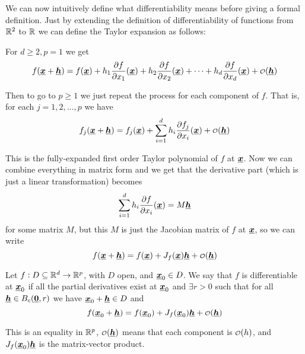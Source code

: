 \documentclass[12pt]{extarticle}
\renewcommand{\vec}[1]{\uvec{#1}}
\begin{document}
We can now intuitively define what differentiability means before giving a formal definition.
Just by extending the definition of differentiability of functions from $\mathbb{R}^2$ to $\mathbb{R}$ we can define the Taylor expansion as follows:

For $d \geq 2, p = 1$ we get
\begin{equation}
    f(\vec{x} + \vec{h}) = f(\vec{x}) + h_1 \pdv{f}{x_1}\/(\vec{x}) + h_2 \pdv{f}{x_2}\/(\vec{x}) + \cdots + h_d \pdv{f}{x_d}\/(\vec{x}) + \o(\vec{h})
\end{equation}

Then to go to $p \geq 1$ we just repeat the process for each component of $f$.
That is, for each $j = 1, 2, \ldots, p$ we have
\begin{equation}
    f_j(\vec{x} + \vec{h}) = f_j(\vec{x}) + \sum_{i=1}^d h_i \pdv{f_j}{x_i}\/(\vec{x}) + \o(\vec{h})
\end{equation}

This is the fully-expanded first order Taylor polynomial of $f$ at $\vec{x}$.
Now we can combine everything in matrix form and we get that the derivative part (which is just a linear transformation) becomes
\begin{equation}
    \sum_{i = 1}^d h_i \pdv{f}{x_i}\/(\vec{x}) = M \vec{h}
\end{equation}
for some matrix $M$, but this $M$ is just the Jacobian matrix of $f$ at $\vec{x}$, so we can write
\begin{equation}
    f(\vec{x} + \vec{h}) = f(\vec{x}) + J_f(\vec{x}) \vec{h} + \o(\vec{h})
\end{equation}

\begin{definition}[differentiability]
    Let $f: D \subseteq \mathbb{R}^d \to \mathbb{R}^p$, with $D$ open, and $\vec{x}_0 \in D$.
    We say that $f$ is differentiable at $\vec{x}_0$ if all the partial derivatives exist at $\vec{x}_0$
    and $\exists r > 0$ such that for all $\vec{h} \in B_c(\vec{0}, r)$ we have $\vec{x}_0 + \vec{h} \in D$ and
    \begin{equation}
        f(\vec{x}_0 + \vec{h}) = f(\vec{x}_0) + J_f(\vec{x}_0) \vec{h} + \o(\vec{h})
    \end{equation}
\end{definition}

\begin{remark}
    This is an equality in $\mathbb{R}^p$, $\o(\vec{h})$ means that each component is $\o(h)$, and $J_f(\vec{x}_0) \vec{h}$ is the matrix-vector product.
\end{remark}
\end{document}
